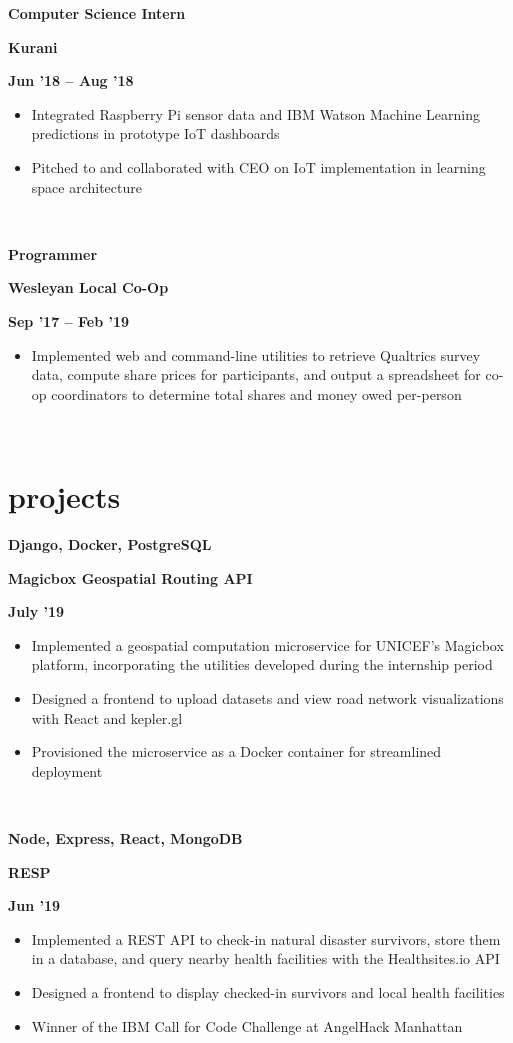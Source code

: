 \documentclass[letterpaper, 11pt]{article}
\newcommand{\expentry}[5]{
    \begin{center}
        \begin{minipage}[b]{0.33333\textwidth}
        \raggedright
        \bf\large #4
        \end{minipage}%
        \begin{minipage}[b]{0.33333\textwidth}
        \centering
        \bf\large#3
        \end{minipage}%
        \begin{minipage}[b]{0.33333\textwidth}
        \raggedleft
        \bf\large {#1} -- {#2}
        \end{minipage}
    \end{center}
    \begin{minipage}[t]{\linewidth}
    \vspace{-6mm}
    \small{#5}
    \end{minipage}\\
    \vspace{1mm}
    }
\newcommand{\projectentry}[4]{
    \begin{center}
        \begin{minipage}[b]{0.33333\textwidth}
        \raggedright
        \bf #3
        \end{minipage}%
        \begin{minipage}[b]{0.33333\textwidth}
        \centering
        \bf #2
        \end{minipage}%
        \begin{minipage}[b]{0.33333\textwidth}
        \raggedleft
        \bf #1
        \end{minipage}
    \end{center}
    \begin{minipage}[t]{\linewidth}
    \vspace{-6mm}
    \small{#4}
    \end{minipage}\\
    \vspace{1mm}
    }
\begin{document}
    \expentry{Jun '18}
    {Aug '18}
    {Kurani}
    {Computer Science Intern}
    {\begin{itemize}
          \setlength\itemsep{0.1mm}
          \item Integrated Raspberry Pi sensor data and IBM Watson Machine Learning predictions in prototype IoT dashboards
          \item Pitched to and collaborated with CEO on IoT implementation in learning space architecture 
        \end{itemize}
    }

    \expentry{Sep '17}
    {Feb '19}
    {Wesleyan Local Co-Op}
    {Programmer}
    {\begin{itemize}
          \setlength\itemsep{0.1mm}
          \item Implemented web and command-line utilities to retrieve Qualtrics survey data, compute share prices for participants, and output a spreadsheet for co-op coordinators to determine total shares and money owed per-person
        \end{itemize}
    }

    \section{projects}

        \projectentry{July '19}
            {Magicbox Geospatial Routing API}
            {Django, Docker, PostgreSQL}
            {\begin{itemize}
                \setlength\itemsep{0.1mm}
                \item Implemented a geospatial computation microservice for UNICEF's Magicbox platform, incorporating the utilities developed during the internship period
                \item Designed a frontend to upload datasets and view road network visualizations with React and kepler.gl
                \item Provisioned the microservice as a Docker container for streamlined deployment
            \end{itemize}
            }

        \projectentry{Jun '19}
            {RESP}
            {Node, Express, React, MongoDB}
            {\begin{itemize}
                \setlength\itemsep{0.1mm}
                \item Implemented a REST API to check-in natural disaster survivors, store them in a database, and query nearby health facilities with the Healthsites.io API
                \item Designed a frontend  to display checked-in survivors and local health facilities
                \item Winner of the IBM Call for Code Challenge at AngelHack Manhattan
            \end{itemize}
            }
            
\end{document}
